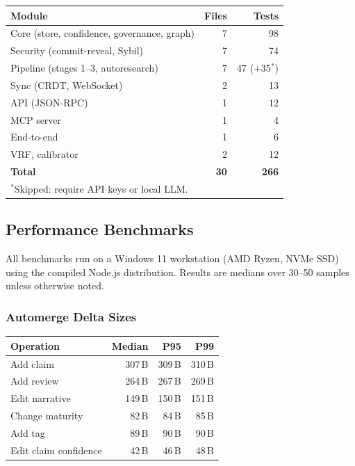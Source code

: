 \documentclass[10pt,twocolumn]{article}
\begin{document}
\begin{center}
\small
\begin{tabular}{lrr}
\toprule
\textbf{Module} & \textbf{Files} & \textbf{Tests} \\
\midrule
Core (store, confidence, governance, graph) & 7 & 98 \\
Security (commit-reveal, Sybil)             & 7 & 74 \\
Pipeline (stages 1--3, autoresearch)        & 7 & 47 (+35$^*$) \\
Sync (CRDT, WebSocket)                      & 2 & 13 \\
API (JSON-RPC)                              & 1 & 12 \\
MCP server                                  & 1 &  4 \\
End-to-end                                  & 1 &  6 \\
VRF, calibrator                             & 2 & 12 \\
\midrule
\textbf{Total}                              & \textbf{30} & \textbf{266} \\
\bottomrule
\multicolumn{3}{l}{$^*$Skipped: require API keys or local LLM.}
\end{tabular}
\end{center}

\subsection{Performance Benchmarks}

All benchmarks run on a Windows 11 workstation (AMD Ryzen, NVMe SSD) using
the compiled Node.js distribution. Results are medians over 30–50 samples
unless otherwise noted.

\subsubsection*{Automerge Delta Sizes}

\begin{center}
\small
\begin{tabular}{lrrr}
\toprule
\textbf{Operation} & \textbf{Median} & \textbf{P95} & \textbf{P99} \\
\midrule
Add claim           & 307\,B & 309\,B & 310\,B \\
Add review          & 264\,B & 267\,B & 269\,B \\
Edit narrative      & 149\,B & 150\,B & 151\,B \\
Change maturity     &  82\,B &  84\,B &  85\,B \\
Add tag             &  89\,B &  90\,B &  90\,B \\
Edit claim confidence & 42\,B & 46\,B &  48\,B \\
\bottomrule
\end{tabular}
\end{center}
\end{document}
